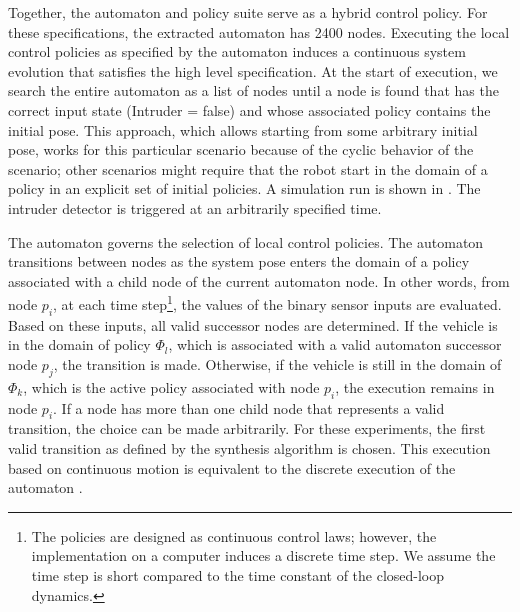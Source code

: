 Together, the automaton and policy suite serve as a hybrid control policy.  For these
specifications, the extracted automaton has 2400 nodes.  Executing the local control
policies as specified by the automaton induces a continuous system evolution that
satisfies the high level specification.  At the start of execution, we search the
entire automaton as a list of nodes until a node is found that has the correct input
state (Intruder = false) and whose associated policy contains the initial pose.  This
approach, which allows starting from some arbitrary initial pose, works for this
particular scenario because of the cyclic behavior of the scenario; other scenarios
might require that the robot start in the domain of a policy in an explicit set of
initial policies.  A simulation run is shown in .
The intruder detector is triggered at an arbitrarily specified time.

The automaton governs the selection of local control policies.  The automaton
transitions between nodes as the system pose enters the domain of a policy associated
with a child node of the current automaton node.  In other words, from node $p_i$, at
each time step\footnote{The policies are designed as continuous control laws;
  however, the implementation on a computer induces a discrete time step.  We assume
  the time step is short compared to the time constant of the closed-loop dynamics.},
the values of the binary sensor inputs are evaluated. Based on these inputs, all
valid successor nodes are determined. If the vehicle is in the domain of policy
$\Phi_{l}$, which is associated with a valid automaton successor node $p_j$, the
transition is made.  Otherwise, if the vehicle is still in the domain of $\Phi_{k}$,
which is the active policy associated with node $p_i$, the execution remains in node
$p_i$.  If a node has more than one child node that represents a valid transition,
the choice can be made arbitrarily.  For these experiments, the first valid
transition as defined by the synthesis algorithm is chosen.  This execution based on
continuous motion is equivalent to the discrete execution of the automaton
\cite{fainekos_05a,belta_06}.


